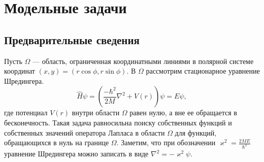 \chapter{Модельные задачи}\label{ch:ch1}

\section{Предварительные сведения}\label{sec:ch1/sec1}
Пусть $\Omega$ --- область, ограниченная координатными линиями в полярной системе координат $(x, y) = (r \cos \phi, r \sin \phi)$. В $\Omega$ рассмотрим стационарное уравнение Шредингера.
\begin{equation*}
\hat{H}\psi = \left( \frac{-\hbar^2}{2M}\nabla^2 + V(r)\right) \psi = E\psi,
\end{equation*}
где потенциал $V(r)$ внутри области $\Omega$ равен нулю, а вне ее обращается в бесконечность. Такая задача равносильна поиску собственных функций и собственных значений оператора Лапласа в области $\Omega$ для функций, обращающихся в нуль на границе $\Omega$. Заметим, что при обозначении $\varkappa^2 = \frac{2 M E}{\hbar^2}$ уравнение Шредингера можно записать в виде $\nabla^2  = -\varkappa^2 \psi.$

